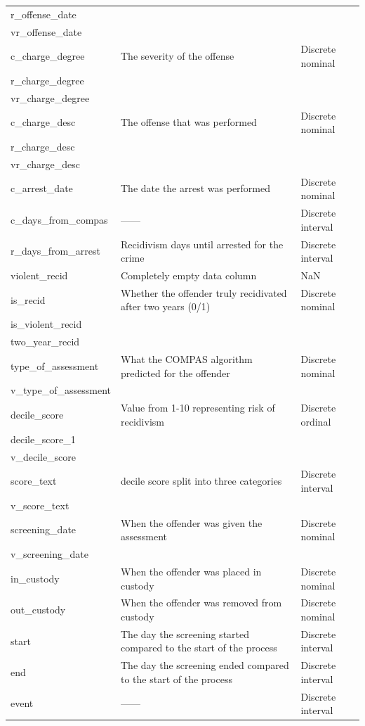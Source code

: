 \documentclass[11pt, fleqn, titlepage]{article}
\begin{document}
\begin{longtable}{l l l}
		r\_offense\_date & & \\
		vr\_offense\_date & & \\ \hdashline
		c\_charge\_degree & The severity of the offense & Discrete nominal \\
		r\_charge\_degree & & \\
		vr\_charge\_degree & & \\ \hdashline
		c\_charge\_desc & The offense that was performed & Discrete nominal \\
		r\_charge\_desc & & \\
		vr\_charge\_desc & & \\ \hdashline
		c\_arrest\_date & The date the arrest was performed & Discrete nominal \\
		c\_days\_from\_compas & ------ & Discrete interval \\
		r\_days\_from\_arrest & Recidivism days until arrested for the crime & Discrete interval \\
		violent\_recid & Completely empty data column & NaN \\ \hdashline
		is\_recid & Whether the offender truly recidivated after two years (0/1) & Discrete nominal \\
		is\_violent\_recid & & \\
		two\_year\_recid & & \\ \hdashline
		type\_of\_assessment & What the COMPAS algorithm predicted for the offender & Discrete nominal \\
		v\_type\_of\_assessment & & \\ \hdashline
		decile\_score & Value from 1-10 representing risk of recidivism & Discrete ordinal \\
		decile\_score\_1 & & \\
		v\_decile\_score & & \\ \hdashline
		score\_text & decile score split into three categories & Discrete interval \\
		v\_score\_text & & \\ \hdashline
		screening\_date & When the offender was given the assessment & Discrete nominal \\
		v\_screening\_date & & \\ \hdashline
		in\_custody & When the offender was placed in custody & Discrete nominal \\
		out\_custody & When the offender was removed from custody & Discrete nominal \\
		start & The day the screening started compared to the start of the process & Discrete interval \\
		end & The day the screening ended compared to the start of the process & Discrete interval \\
		event & ------ & Discrete interval
	\end{longtable}
		
\end{document}

